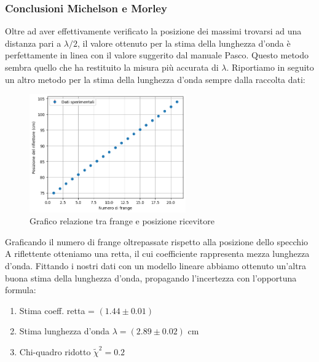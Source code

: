 \documentclass[letterpaper,12pt]{article}
\begin{document}
\subsubsection{Conclusioni Michelson e Morley}
Oltre ad aver effettivamente verificato la posizione dei massimi trovarsi ad una distanza pari a $\lambda/2$, 
il valore ottenuto per la stima della lunghezza d'onda è perfettamente in linea con il valore suggerito dal manuale Pasco.
Questo metodo sembra quello che ha restituito la misura più accurata di $\lambda$. Riportiamo in seguito un altro metodo per la stima 
della lunghezza d'onda sempre dalla raccolta dati:
\begin{figure}[h!]
	\centering
	\includegraphics[width = 0.6\textwidth]{MichelsonGrafico.png}
	\caption{Grafico relazione tra frange e posizione ricevitore}
	\label{fig:GraficoBragg2}
\end{figure}

Graficando il numero di frange oltrepassate rispetto alla posizione dello specchio A riflettente otteniamo una retta,
il cui coefficiente rappresenta mezza lunghezza d'onda. Fittando i nostri dati con un modello lineare abbiamo ottenuto un'altra buona stima della lunghezza d'onda, propagando l'incertezza con l'opportuna formula:
\begin{enumerate}
	\item Stima coeff. retta = $(1.44\pm0.01)$
	\item Stima lunghezza d'onda $ \lambda = (2.89\pm0.02)$ cm
	\item Chi-quadro ridotto $\widetilde{\chi}^2 = 0.2$
\end{enumerate}

\newpage
\end{document}
